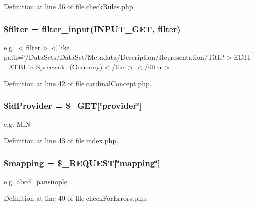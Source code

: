 Definition at line 36 of file check\+Rules.\+php.

\subsubsection[{\texorpdfstring{\$filter}{$filter}}]{\setlength{\rightskip}{0pt plus 5cm}\$filter = filter\+\_\+input(I\+N\+P\+U\+T\+\_\+\+G\+ET, \textquotesingle{}filter\textquotesingle{})}\hypertarget{namespace_consistency_aac53bdb48bdd96ff9c20e2a86f48ce5f}{}\label{namespace_consistency_aac53bdb48bdd96ff9c20e2a86f48ce5f}
e.\+g. $<$filter$>$$<$like path=\char`\"{}/\+Data\+Sets/\+Data\+Set/\+Metadata/\+Description/\+Representation/\+Title\char`\"{}$>$E\+D\+IT -\/ A\+T\+BI in Spreewald (Germany)$<$/like$>$$<$/filter$>$ 

Definition at line 42 of file cardinal\+Concept.\+php.

\subsubsection[{\texorpdfstring{\$id\+Provider}{$idProvider}}]{\setlength{\rightskip}{0pt plus 5cm}\$id\+Provider = \$\+\_\+\+G\+ET\mbox{[}\char`\"{}provider\char`\"{}\mbox{]}}\hypertarget{namespace_consistency_a7c95ff52e91cdd46d783255e270c6d7f}{}\label{namespace_consistency_a7c95ff52e91cdd46d783255e270c6d7f}
e.\+g. MfN 

Definition at line 43 of file index.\+php.

\subsubsection[{\texorpdfstring{\$mapping}{$mapping}}]{\setlength{\rightskip}{0pt plus 5cm}\$mapping = \$\+\_\+\+R\+E\+Q\+U\+E\+ST\mbox{[}\char`\"{}mapping\char`\"{}\mbox{]}}\hypertarget{namespace_consistency_a2c93d0b89d7eadb6b8dfb7c83bc991f9}{}\label{namespace_consistency_a2c93d0b89d7eadb6b8dfb7c83bc991f9}
e.\+g. abcd\+\_\+pansimple 

Definition at line 40 of file check\+For\+Errors.\+php.


